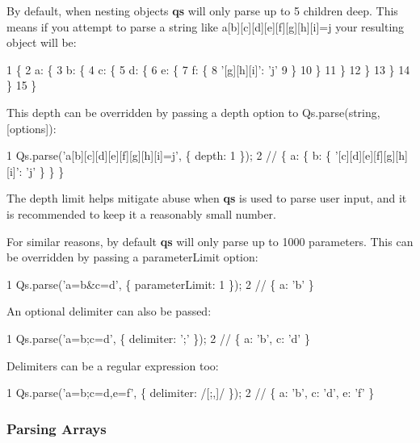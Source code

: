 By default, when nesting objects {\bfseries qs} will only parse up to 5 children deep. This means if you attempt to parse a string like {\ttfamily \textquotesingle{}a\mbox{[}b\mbox{]}\mbox{[}c\mbox{]}\mbox{[}d\mbox{]}\mbox{[}e\mbox{]}\mbox{[}f\mbox{]}\mbox{[}g\mbox{]}\mbox{[}h\mbox{]}\mbox{[}i\mbox{]}=j\textquotesingle{}} your resulting object will be\+:


\begin{DoxyCode}
1 \{
2   a: \{
3     b: \{
4       c: \{
5         d: \{
6           e: \{
7             f: \{
8               '[g][h][i]': 'j'
9             \}
10           \}
11         \}
12       \}
13     \}
14   \}
15 \}
\end{DoxyCode}


This depth can be overridden by passing a {\ttfamily depth} option to {\ttfamily Qs.\+parse(string, \mbox{[}options\mbox{]})}\+:


\begin{DoxyCode}
1 Qs.parse('a[b][c][d][e][f][g][h][i]=j', \{ depth: 1 \});
2 // \{ a: \{ b: \{ '[c][d][e][f][g][h][i]': 'j' \} \} \}
\end{DoxyCode}


The depth limit helps mitigate abuse when {\bfseries qs} is used to parse user input, and it is recommended to keep it a reasonably small number.

For similar reasons, by default {\bfseries qs} will only parse up to 1000 parameters. This can be overridden by passing a {\ttfamily parameter\+Limit} option\+:


\begin{DoxyCode}
1 Qs.parse('a=b&c=d', \{ parameterLimit: 1 \});
2 // \{ a: 'b' \}
\end{DoxyCode}


An optional delimiter can also be passed\+:


\begin{DoxyCode}
1 Qs.parse('a=b;c=d', \{ delimiter: ';' \});
2 // \{ a: 'b', c: 'd' \}
\end{DoxyCode}


Delimiters can be a regular expression too\+:


\begin{DoxyCode}
1 Qs.parse('a=b;c=d,e=f', \{ delimiter: /[;,]/ \});
2 // \{ a: 'b', c: 'd', e: 'f' \}
\end{DoxyCode}


\subsubsection*{Parsing Arrays}

